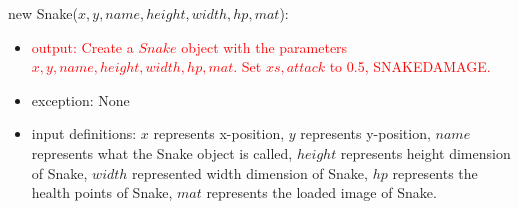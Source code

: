 \documentclass[12pt]{article}
\newcommand{\m}[1]{\mbox{#1}}
\begin{document}
new Snake($x, y, name, height, width, hp, mat$):
\begin{itemize}
    \item \textcolor{red}{output: Create a $Snake$ object with the parameters $x, y, name, height, width, hp, mat$. Set $xs, attack$ to 0.5, SNAKEDAMAGE.}
    \item exception: None
    \item input definitions: $x$ represents x-position, $y$ represents y-position, $name$ represents what the Snake object is called, $height$ represents height dimension of Snake, $width$ represented width dimension of Snake, $hp$ represents the health points of Snake, $mat$ represents the loaded image of Snake.
\end{itemize}



\end{document}
